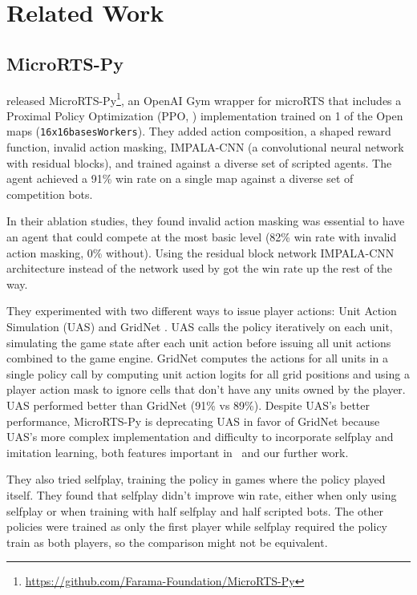 \documentclass{article}
\begin{document}
\section{Related Work}
\subsection{MicroRTS-Py}
\citet{DBLP:journals/corr/abs-2105-13807} released MicroRTS-Py\footnote{\url{https://github.com/Farama-Foundation/MicroRTS-Py}}, an OpenAI Gym
wrapper for microRTS that includes a Proximal Policy Optimization (PPO, \citet{DBLP:journals/corr/SchulmanWDRK17}) implementation
trained on 1 of the Open maps (\texttt{16x16basesWorkers}). They added action composition, a shaped reward function, invalid action
masking, IMPALA-CNN (a convolutional neural network with residual blocks), and trained
against a diverse set of scripted agents. The agent achieved a
91\% win rate on a single map against a diverse set of competition bots.

In their ablation studies, they found invalid action masking was essential to have an agent that could compete at
the most basic level (82\% win rate with invalid action masking, 0\% without). Using the
residual block network IMPALA-CNN architecture instead of the network used by
\citet{DBLP:journals/corr/MnihKSGAWR13} got the win rate up the rest of the way.

They experimented with two different ways to issue player actions: Unit Action Simulation (UAS)
and GridNet \citep{pmlr-v97-han19a}. UAS calls the policy iteratively on each unit, simulating the game state
after each unit action before issuing all unit actions combined to the game engine. GridNet
computes the actions for all units in a single policy call by computing unit action
logits for all grid positions and using a player action mask to ignore cells that don't
have any units owned by the player. UAS performed better than GridNet (91\% vs 89\%).
Despite UAS's better performance, MicroRTS-Py is deprecating UAS in favor of GridNet
because UAS's more complex implementation and difficulty to incorporate selfplay and
imitation learning, both features important in \agentName\ and our further work.

They also tried selfplay, training the policy in games where the policy played itself. 
They found that selfplay didn't improve win rate,
either when only using selfplay or when training with half selfplay and half scripted
bots. The other policies were trained as only the first player while selfplay required
the policy train as both players, so the comparison might not be equivalent.
\end{document}
